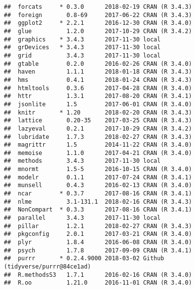 \documentclass[12pt,]{krantz}
\theoremstyle{definition}
\theoremstyle{definition}
\theoremstyle{definition}
\theoremstyle{remark}
\begin{document}
\begin{verbatim}
##  forcats     * 0.3.0      2018-02-19 CRAN (R 3.4.3)                      
##  foreign       0.8-69     2017-06-22 CRAN (R 3.4.3)                      
##  ggplot2     * 2.2.1      2016-12-30 CRAN (R 3.4.0)                      
##  glue          1.2.0      2017-10-29 CRAN (R 3.4.2)                      
##  graphics    * 3.4.3      2017-11-30 local                               
##  grDevices   * 3.4.3      2017-11-30 local                               
##  grid          3.4.3      2017-11-30 local                               
##  gtable        0.2.0      2016-02-26 CRAN (R 3.4.0)                      
##  haven         1.1.1      2018-01-18 CRAN (R 3.4.3)                      
##  hms           0.4.1      2018-01-24 CRAN (R 3.4.3)                      
##  htmltools     0.3.6      2017-04-28 CRAN (R 3.4.0)                      
##  httr          1.3.1      2017-08-20 CRAN (R 3.4.1)                      
##  jsonlite      1.5        2017-06-01 CRAN (R 3.4.0)                      
##  knitr       * 1.20       2018-02-20 CRAN (R 3.4.3)                      
##  lattice       0.20-35    2017-03-25 CRAN (R 3.4.3)                      
##  lazyeval      0.2.1      2017-10-29 CRAN (R 3.4.2)                      
##  lubridate     1.7.3      2018-02-27 CRAN (R 3.4.3)                      
##  magrittr      1.5        2014-11-22 CRAN (R 3.4.0)                      
##  memoise       1.1.0      2017-04-21 CRAN (R 3.4.0)                      
##  methods       3.4.3      2017-11-30 local                               
##  mnormt        1.5-5      2016-10-15 CRAN (R 3.4.0)                      
##  modelr        0.1.1      2017-07-24 CRAN (R 3.4.1)                      
##  munsell       0.4.3      2016-02-13 CRAN (R 3.4.0)                      
##  ncar        * 0.3.7      2017-08-16 CRAN (R 3.4.1)                      
##  nlme          3.1-131.1  2018-02-16 CRAN (R 3.4.3)                      
##  NonCompart  * 0.3.3      2017-08-16 CRAN (R 3.4.1)                      
##  parallel      3.4.3      2017-11-30 local                               
##  pillar        1.2.1      2018-02-27 CRAN (R 3.4.3)                      
##  pkgconfig     2.0.1      2017-03-21 CRAN (R 3.4.0)                      
##  plyr          1.8.4      2016-06-08 CRAN (R 3.4.0)                      
##  psych         1.7.8      2017-09-09 CRAN (R 3.4.1)                      
##  purrr       * 0.2.4.9000 2018-03-02 Github (tidyverse/purrr@84ce1ad)    
##  R.methodsS3   1.7.1      2016-02-16 CRAN (R 3.4.0)                      
##  R.oo          1.21.0     2016-11-01 CRAN (R 3.4.0)                      

\end{verbatim}
\end{document}
